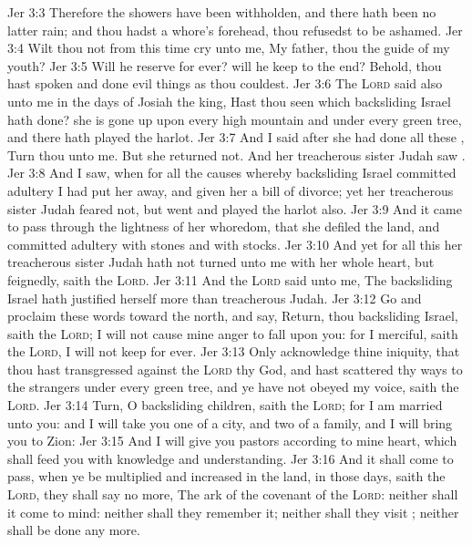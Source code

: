 \vs Jer 3:3 Therefore the showers have been withholden, and there hath been no latter rain; and thou hadst a whore's forehead, thou refusedst to be ashamed.
\vs Jer 3:4 Wilt thou not from this time cry unto me, My father, thou  the guide of my youth?
\vs Jer 3:5 Will he reserve  for ever? will he keep  to the end? Behold, thou hast spoken and done evil things as thou couldest.
\vs Jer 3:6 The \textsc{Lord} said also unto me in the days of Josiah the king, Hast thou seen  which backsliding Israel hath done? she is gone up upon every high mountain and under every green tree, and there hath played the harlot.
\vs Jer 3:7 And I said after she had done all these , Turn thou unto me. But she returned not. And her treacherous sister Judah saw .
\vs Jer 3:8 And I saw, when for all the causes whereby backsliding Israel committed adultery I had put her away, and given her a bill of divorce; yet her treacherous sister Judah feared not, but went and played the harlot also.
\vs Jer 3:9 And it came to pass through the lightness of her whoredom, that she defiled the land, and committed adultery with stones and with stocks.
\vs Jer 3:10 And yet for all this her treacherous sister Judah hath not turned unto me with her whole heart, but feignedly, saith the \textsc{Lord}.
\vs Jer 3:11 And the \textsc{Lord} said unto me, The backsliding Israel hath justified herself more than treacherous Judah.
\vs Jer 3:12 Go and proclaim these words toward the north, and say, Return, thou backsliding Israel, saith the \textsc{Lord};  I will not cause mine anger to fall upon you: for I  merciful, saith the \textsc{Lord},  I will not keep  for ever.
\vs Jer 3:13 Only acknowledge thine iniquity, that thou hast transgressed against the \textsc{Lord} thy God, and hast scattered thy ways to the strangers under every green tree, and ye have not obeyed my voice, saith the \textsc{Lord}.
\vs Jer 3:14 Turn, O backsliding children, saith the \textsc{Lord}; for I am married unto you: and I will take you one of a city, and two of a family, and I will bring you to Zion:
\vs Jer 3:15 And I will give you pastors according to mine heart, which shall feed you with knowledge and understanding.
\vs Jer 3:16 And it shall come to pass, when ye be multiplied and increased in the land, in those days, saith the \textsc{Lord}, they shall say no more, The ark of the covenant of the \textsc{Lord}: neither shall it come to mind: neither shall they remember it; neither shall they visit ; neither shall  be done any more.
